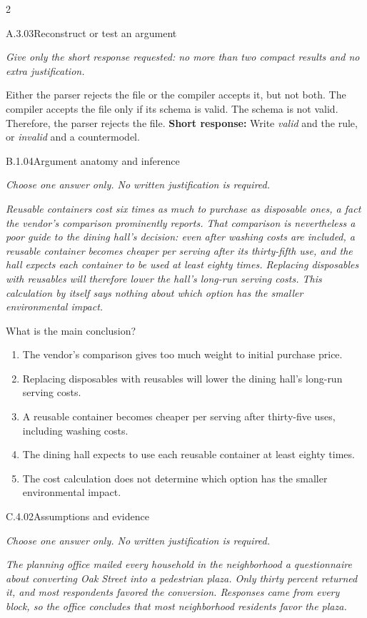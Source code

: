 \documentclass[9pt]{extarticle}
\newcommand{\choice}[1]{\item #1}
\begin{document}
\FormBreak
{}
\begin{multicols}{2}
\begin{DenseCoreProblem}{A.3.03}{Reconstruct or test an argument}
{\scriptsize\textit{Give only the short response requested: no more than two compact results and no extra justification.}\par}
Either the parser rejects the file or the compiler accepts it, but not both. The compiler accepts the file only if its schema is valid. The schema is not valid. Therefore, the parser rejects the file.
\textbf{Short response:} Write \emph{valid} and the rule, or \emph{invalid} and a countermodel.
\end{DenseCoreProblem}
\begin{DenseCoreProblem}{B.1.04}{Argument anatomy and inference}
{\scriptsize\textit{Choose one answer only. No written justification is required.}\par}
\emph{Reusable containers cost six times as much to purchase as disposable ones, a fact the vendor's comparison prominently reports. That comparison is nevertheless a poor guide to the dining hall's decision: even after washing costs are included, a reusable container becomes cheaper per serving after its thirty-fifth use, and the hall expects each container to be used at least eighty times. Replacing disposables with reusables will therefore lower the hall's long-run serving costs. This calculation by itself says nothing about which option has the smaller environmental impact.}

What is the main conclusion?
\begin{enumerate}[label=(\alph*)]
  \choice{The vendor's comparison gives too much weight to initial purchase price.}
  \choice{Replacing disposables with reusables will lower the dining hall's long-run serving costs.}
  \choice{A reusable container becomes cheaper per serving after thirty-five uses, including washing costs.}
  \choice{The dining hall expects to use each reusable container at least eighty times.}
  \choice{The cost calculation does not determine which option has the smaller environmental impact.}
\end{enumerate}
\end{DenseCoreProblem}
\columnbreak
\begin{DenseCoreProblem}{C.4.02}{Assumptions and evidence}
{\scriptsize\textit{Choose one answer only. No written justification is required.}\par}
\emph{The planning office mailed every household in the neighborhood a questionnaire about converting Oak Street into a pedestrian plaza. Only thirty percent returned it, and most respondents favored the conversion. Responses came from every block, so the office concludes that most neighborhood residents favor the plaza.}


\end{DenseCoreProblem}
\end{multicols}
\end{document}
